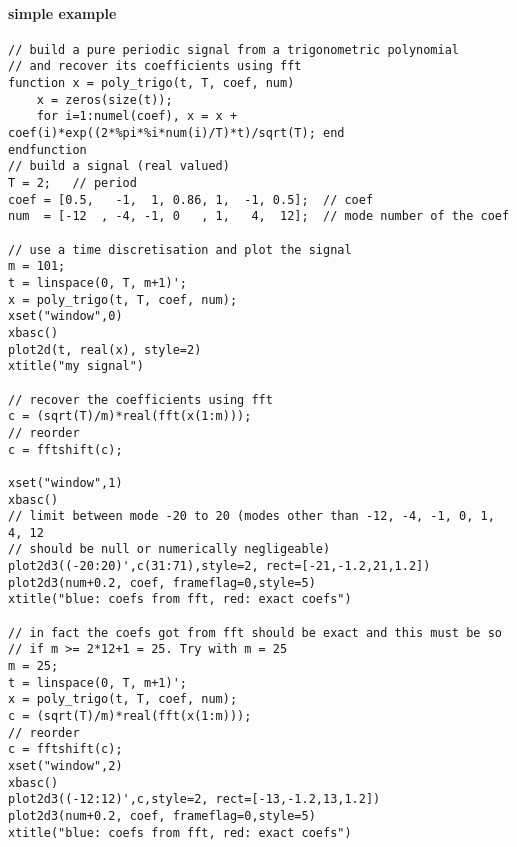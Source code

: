 \begin{examples}
 \paragraph{simple example}
  \begin{Verbatim}
// build a pure periodic signal from a trigonometric polynomial
// and recover its coefficients using fft
function x = poly_trigo(t, T, coef, num)
    x = zeros(size(t));
    for i=1:numel(coef), x = x + coef(i)*exp((2*%pi*%i*num(i)/T)*t)/sqrt(T); end
endfunction
// build a signal (real valued)
T = 2;   // period
coef = [0.5,   -1,  1, 0.86, 1,  -1, 0.5];  // coef
num  = [-12  , -4, -1, 0   , 1,   4,  12];  // mode number of the coef

// use a time discretisation and plot the signal
m = 101;
t = linspace(0, T, m+1)';
x = poly_trigo(t, T, coef, num);
xset("window",0)
xbasc()
plot2d(t, real(x), style=2)
xtitle("my signal")

// recover the coefficients using fft
c = (sqrt(T)/m)*real(fft(x(1:m)));
// reorder
c = fftshift(c);

xset("window",1)
xbasc()
// limit between mode -20 to 20 (modes other than -12, -4, -1, 0, 1, 4, 12
// should be null or numerically negligeable)
plot2d3((-20:20)',c(31:71),style=2, rect=[-21,-1.2,21,1.2])
plot2d3(num+0.2, coef, frameflag=0,style=5)
xtitle("blue: coefs from fft, red: exact coefs")

// in fact the coefs got from fft should be exact and this must be so
// if m >= 2*12+1 = 25. Try with m = 25
m = 25;
t = linspace(0, T, m+1)';
x = poly_trigo(t, T, coef, num);
c = (sqrt(T)/m)*real(fft(x(1:m)));
// reorder
c = fftshift(c);
xset("window",2)
xbasc()
plot2d3((-12:12)',c,style=2, rect=[-13,-1.2,13,1.2])
plot2d3(num+0.2, coef, frameflag=0,style=5)
xtitle("blue: coefs from fft, red: exact coefs")
  \end{Verbatim}
 \end{examples}

